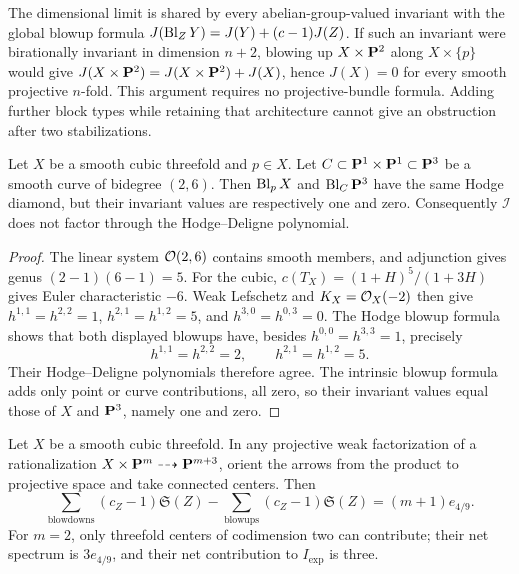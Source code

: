 The dimensional limit is shared by every abelian-group-valued invariant
with the global blowup formula \(J(\operatorname{Bl}_ZY)=J(Y)+(c-1)J(Z)\).
If such an invariant were birationally invariant in dimension \(n+2\),
blowing up \(X\times\mathbf P^2\) along \(X\times\{p\}\) would give
\(J(X\times\mathbf P^2)=J(X\times\mathbf P^2)+J(X)\), hence \(J(X)=0\) for every
smooth projective \(n\)-fold.  This argument requires no projective-bundle
formula.  Adding further block types while retaining that architecture
cannot give an obstruction after two stabilizations.

\begin{proposition}
\label{prop:hodge-marker-separation}
%
%
Let \(X\) be a smooth cubic threefold and \(p\in X\).  Let
\(C\subset\mathbf P^1\times\mathbf P^1\subset\mathbf P^3\) be a smooth curve of
bidegree \((2,6)\).  Then \(\operatorname{Bl}_pX\) and \(\operatorname{Bl}_C\mathbf P^3\) have the same
Hodge diamond, but their invariant values are respectively one and zero.
Consequently \(\mathcal I\) does not factor through the Hodge--Deligne
polynomial.
\end{proposition}

\begin{proof}
The linear system \(\mathcal O(2,6)\) contains smooth members, and adjunction
gives genus \((2-1)(6-1)=5\).  For the cubic,
\(c(T_X)=(1+H)^5/(1+3H)\) gives Euler characteristic \(-6\).
Weak Lefschetz and \(K_X=\mathcal O_X(-2)\) then give
\(h^{1,1}=h^{2,2}=1\), \(h^{2,1}=h^{1,2}=5\), and
\(h^{3,0}=h^{0,3}=0\).  The Hodge blowup formula shows that both displayed
blowups have, besides \(h^{0,0}=h^{3,3}=1\), precisely
\[
 h^{1,1}=h^{2,2}=2,\qquad h^{2,1}=h^{1,2}=5.
\]
Their Hodge--Deligne polynomials therefore agree.  The intrinsic blowup
formula adds only point or curve contributions, all zero, so their invariant
values equal those of \(X\) and \(\mathbf P^3\), namely one and zero.
%
\end{proof}

\begin{corollary}
\label{cor:factorization-spectrum}
%
%
%
Let \(X\) be a smooth cubic threefold.  In any projective weak
factorization of a rationalization
\(X\times\mathbf P^m\dashrightarrow\mathbf P^{m+3}\), orient the arrows from the
product to projective space and take connected centers.  Then
\[
 \sum_{\mathrm{blowdowns}}(c_Z-1)\mathfrak S(Z)
 -\sum_{\mathrm{blowups}}(c_Z-1)\mathfrak S(Z)
 =(m+1)e_{4/9}.
\]
For \(m=2\), only threefold centers of codimension two can contribute;
their net spectrum is \(3e_{4/9}\), and their net contribution to \(I_{\mathrm{exp}}\) is three.
\end{corollary}

